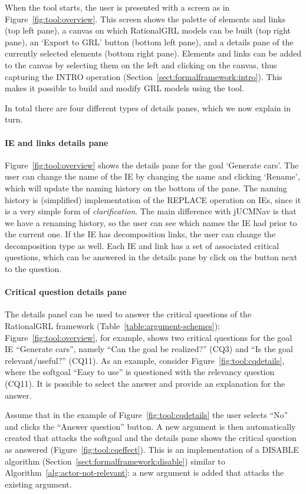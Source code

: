 When the tool starts, the user is presented with a screen as in Figure~\ref{fig:tool:overview}. This screen shows the palette of elements and links (top left pane), a canvas on which RationalGRL models can be built (top right pane), an `Export to GRL' button (bottom left pane), and a details pane of the currently selected elements (bottom right pane). Elements and links can be added to the canvas by selecting them on the left and clicking on the canvas, thus capturing the \textsf{INTRO} operation (Section~\ref{sect:formalframework:intro}). This makes it possible to build and modify GRL models using the tool. 

In total there are four different types of details panes, which we now explain in turn.

\paragraph{IE and links details pane} Figure~\ref{fig:tool:overview} shows the details pane for the goal `Generate cars'. The user can change the name of the IE by changing the name and clicking `Rename', which will update the naming history on the bottom of the pane. The naming history is (simplified) implementation of the \textsf{REPLACE} operation on IEs, since it is a very simple form of \emph{clarification}. The main difference with jUCMNav is that we have a renaming history, so the user can see which names the IE had prior to the current one. If the IE has decomposition links, the user can change the decomposition type as well. Each IE and link has a set of associated critical questions, which can be answered in the details pane by click on the button next to the question.

\paragraph{Critical question details pane} The details panel can be used to answer the critical questions of the RationalGRL framework (Table~\ref{table:argument-schemes}): Figure~\ref{fig:tool:overview}, for example, shows two critical questions for the goal IE ``Generate cars'', namely ``Can the goal be realized?'' (CQ3) and ``Is the goal relevant/useful?'' (CQ11). As an example, consider Figure~\ref{fig:tool:cqdetails}, where the softgoal ``Easy to use'' is questioned with the relevancy question (CQ11). It is possible to select the answer and provide an explanation for the answer. 

Assume that in the example of Figure~\ref{fig:tool:cqdetails} the user selects ``No'' and clicks the ``Answer question'' button. A new argument is then automatically created that attacks the softgoal and the details pane shows the critical question as answered (Figure~\ref{fig:tool:cqeffect}). This is an implementation of a \textsf{DISABLE} algorithm (Section~\ref{sect:formalframework:disable}) similar to Algorithm~\ref{alg:actor-not-relevant}: a new argument is added that attacks the existing argument. 

